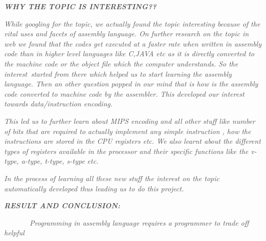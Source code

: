 \documentclass[12pt]{article}
\begin{document}
{\fontsize{28pt}{33.6pt}\selectfont \textbf{\textit{\textcolor[HTML]{525252}{WHY THE TOPIC IS INTERESTING??}}}\par}\par

\begin{adjustwidth}{0.5in}{0.0in}
\textit{\textcolor[HTML]{525252}{While googling for the topic, we actually found the topic interesting because of the vital uses and facets of assembly language. On further research on the topic in web we found that the codes get executed at a faster rate when written in assembly code than in higher level languages like C,JAVA etc as it is directly converted to the machine code or the object file which the computer understands. So the interest\ started from there which helped us to start learning the assembly language.  Then an other question popped in our mind that is how is the assembly code converted to machine code by the assembler. This developed our interest towards data/instruction encoding.}}\par

\end{adjustwidth}

\begin{adjustwidth}{0.5in}{0.0in}
\textit{\textcolor[HTML]{525252}{This led us to further learn about MIPS encoding and all other stuff like number of bits that are required to actually implement any simple instruction , how the instructions are stored in the CPU registers etc. We also learnt about the different types of registers available in the processor and their specific functions like the v-type, a-type, t-type, s-type etc.}}\par

\end{adjustwidth}

\begin{adjustwidth}{0.5in}{0.0in}
\textit{\textcolor[HTML]{525252}{In the process of learning all these new stuff the interest on the topic automatically developed thus leading us to do this project.}}\par

\end{adjustwidth}

{\fontsize{28pt}{33.6pt}\selectfont \textbf{\textit{\textcolor[HTML]{525252}{RESULT AND CONCLUSION:}}}\par}\par

\begin{adjustwidth}{0.5in}{0.0in}
\textit{\textcolor[HTML]{525252}{\ \  \ \ \ \ \  Programming in assembly language requires a programmer to trade off helpful}}\par

\end{adjustwidth}
\end{document}

